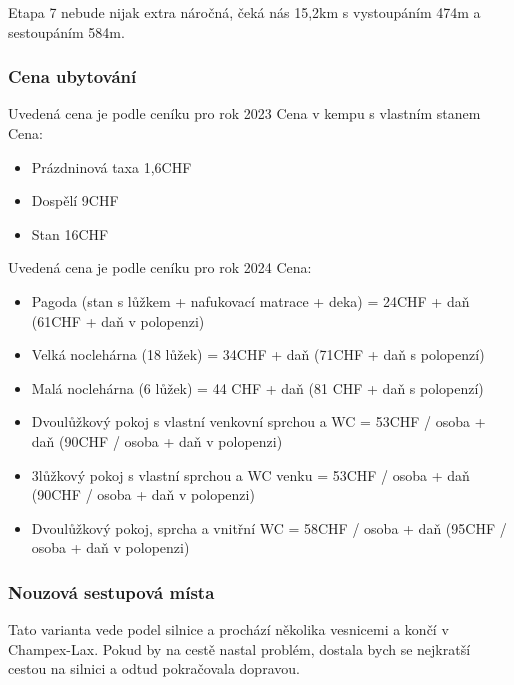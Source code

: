 Etapa 7 nebude nijak extra náročná, čeká nás 15,2\:km s vystoupáním 474\:m a sestoupáním 584\:m.
\subsubsection*{Cena ubytování}
\noindent Uvedená cena je podle ceníku pro rok 2023
\noindent Cena v kempu s vlastním stanem
\noindent Cena:
\begin{itemize}
	\item Prázdninová taxa 1,6\:CHF
	\item Dospělí 9\:CHF
	\item Stan 16\:CHF
\end{itemize}

\noindent Uvedená cena je podle ceníku pro rok 2024
\noindent Cena:
\begin{itemize}
	\item Pagoda (stan s lůžkem + nafukovací matrace + deka) = 24\:CHF + daň (61\:CHF + daň v polopenzi)
	\item Velká noclehárna (18 lůžek) = 34\:CHF + daň (71\:CHF + daň s polopenzí)
	\item Malá noclehárna (6 lůžek) = 44 CHF + daň (81 CHF + daň s polopenzí)
	\item Dvoulůžkový pokoj s vlastní venkovní sprchou a WC = 53\:CHF / osoba + daň (90\:CHF / osoba + daň v polopenzi)
	\item 3lůžkový pokoj s vlastní sprchou a WC venku = 53\:CHF / osoba + daň (90\:CHF / osoba + daň v polopenzi)
	\item Dvoulůžkový pokoj, sprcha a vnitřní WC = 58\:CHF / osoba + daň (95\:CHF / osoba + daň v polopenzi)
\end{itemize}
\subsubsection*{Nouzová sestupová místa}
Tato varianta vede podel silnice a prochází několika vesnicemi a končí v Champex-Lax. Pokud by na cestě nastal problém, dostala bych se nejkratší cestou na silnici a odtud pokračovala dopravou.
